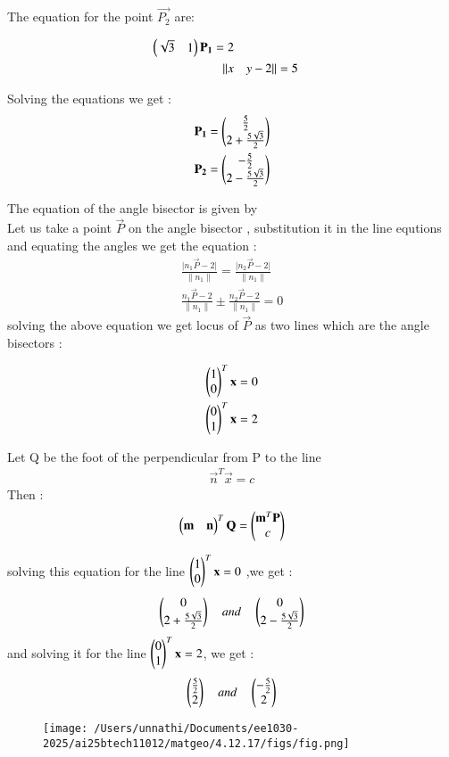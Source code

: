 \documentclass[journal]{IEEEtran}
\begin{document}
The equation for the point $\vec{P_2}$ are:

\begin{align}
\begin{pmatrix}\sqrt{3} & 1\end{pmatrix}\mathbf{P_1} = 2\\
\lVert x &\quad y-2 \rVert = 5
\end{align}

Solving the equations we get :
\begin{align}
   \mathbf{P_1} = \begin{pmatrix}\frac{5}{2} \\ 2+\frac{5\sqrt{3}}{2}\end{pmatrix} \\
    \mathbf{P_2} = \begin{pmatrix}-\frac{5}{2} \\ 2-\frac{5\sqrt{3}}{2}\end{pmatrix}
\end{align}

The equation of the angle bisector is given by \\
Let us take a point $\vec{P}$ on the angle bisector , substitution it in the line equtions and equating the angles we get the equation :
\begin{align}
  \frac{\lvert n_1\vec{P} - 2 \rvert}{\lVert n_1\rVert}  =  \frac{\lvert n_2\vec{P} - 2 \rvert}{\lVert n_1\rVert} \\
  \frac{n_1\vec{P} - 2}{\lVert n_1\rVert} \pm \frac{ n_2\vec{P} - 2}{\lVert n_1\rVert} = 0
\end{align}
solving the above equation we get locus of $\vec{P}$ as two lines which are the angle bisectors :

\begin{align}
    \begin{pmatrix}1\\0\end{pmatrix}^{T}\mathbf{x} = 0\\
     \begin{pmatrix}0\\1\end{pmatrix}^{T}\mathbf{x} = 2
\end{align}

Let Q be the foot of the perpendicular from P to the line
\begin{align}
    \vec{n}^{T}\vec{x} = c
\end{align}
Then :
\begin{align}
    \begin{pmatrix}\mathbf{m}&\mathbf{n}\end{pmatrix}^{T}\mathbf{Q} = \begin{pmatrix}\mathbf{m}^{T}\mathbf{P}\\c\end{pmatrix}
\end{align}

solving this equation for the line $\begin{pmatrix}1\\0\end{pmatrix}^{T}\mathbf{x} = 0$ ,we get :
\begin{align}
    \begin{pmatrix}0\\2+\frac{5\sqrt{3}}{2}\end{pmatrix} \quad and \quad \begin{pmatrix}0\\2-\frac{5\sqrt{3}}{2}\end{pmatrix}
\end{align}
and solving it for the line $\begin{pmatrix}0\\1\end{pmatrix}^{T}\mathbf{x} = 2$, we get :
\begin{align}
    \begin{pmatrix}\frac{5}{2} \\ 2\end{pmatrix} \quad and \quad \begin{pmatrix}-\frac{5}{2} \\ 2\end{pmatrix}
\end{align}



\begin{figure}[h!]
   \centering
   \texttt{[image: /Users/unnathi/Documents/ee1030-2025/ai25btech11012/matgeo/4.12.17/figs/fig.png]}
   \caption{}
   \label{stemplot}
\end{figure}
\end{document}
